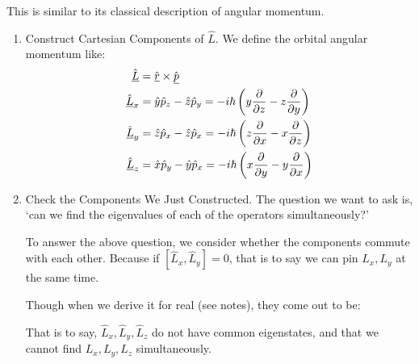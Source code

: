 \documentclass{school-22.101-notes}
\begin{document}
This is similar to its classical description of angular momentum. 

\begin{enumerate}
\item Construct Cartesian Components of $\hat{L}$. 
We define the orbital angular momentum like:
\begin{align}
\hat{\underline{L}} &= \hat{\underline{r}} \times \hat{\underline{p}} \\
\hat{\underline{L}}_x &= \hat{y} \hat{p}_z - \hat{z} \hat{p}_y = - i\hbar \left( y \frac{\partial}{\partial z} - z \frac{\partial}{\partial y} \right) \\
\hat{\underline{L}}_y &= \hat{z} \hat{p}_x - \hat{z} \hat{p}_x = - i\hbar \left( z \frac{\partial}{\partial x} - x \frac{\partial}{\partial z} \right) \\
\hat{\underline{L}}_z &= \hat{x} \hat{p}_y - \hat{y} \hat{p}_x = - i\hbar \left( x \frac{\partial}{\partial y} - y \frac{\partial}{\partial x} \right) 
\end{align}

\item Check the Components We Just Constructed. 
The question we want to ask is, `can we find the eigenvalues of each of the operators simultaneously?'

To answer the above question, we consider whether the components commute with each other. Because if $\left[ \hat{L}_x, \hat{L}_y \right] = 0$, that is to say we can pin $L_x, L_y$ at the same time. 

Though when we derive it for real (see notes), they come out to be:

That is to say, $\hat{L}_x, \hat{L}_y, \hat{L}_z$ do not have common eigenstates, and that we cannot find $L_x, L_y, L_z$ simultaneously. 


\end{enumerate}
\end{document}
